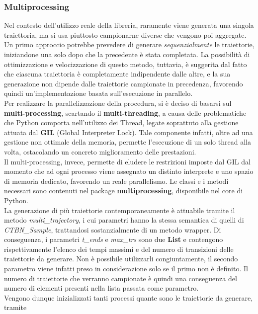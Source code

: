   \subsubsection{Multiprocessing}
  Nel contesto dell'utilizzo reale della libreria, raramente viene generata una singola traiettoria, ma si usa piuttosto
  campionarne diverse che vengono poi aggregate. Un primo approccio potrebbe prevedere di generare
  \textit{sequenzialmente} le traiettorie, iniziandone una solo dopo che la precedente è stata completata.
  La possibilità di ottimizzazione e velocizzazione di questo metodo, tuttavia, è suggerita dal fatto
  che ciascuna traiettoria è completamente indipendente dalle altre, e la sua generazione non dipende
  dalle traiettorie campionate in precedenza, favorendo quindi un'implementazione basata sull'esecuzione in parallelo.\\
  Per realizzare la parallelizzazione della procedura, si è deciso di basarsi sul \textbf{multi-processing},
  scartando il \textbf{multi-threading}, a causa delle problematiche che Python comporta
  nell'utilizzo dei Thread, legate soprattuto alla gestione attuata dal \textbf{GIL} (Global Interpreter Lock).
  Tale componente infatti, oltre ad una gestione non ottimale della memoria, permette l'esecuzione di un solo thread alla volta, 
  ostacolando un concreto miglioramento delle prestazioni.\\
  Il multi-processing, invece, permette di eludere le restrizioni imposte dal GIL dal momento che
  ad ogni processo viene assegnato un distinto interprete e uno spazio di memoria dedicato, favorendo
  un reale parallelismo. Le classi e i metodi necessari sono contenuti nel package \textbf{multiprocessing},
  disponibile nel core di Python.\\
  La generazione di più traiettorie contemporaneamente è attuabile tramite il metodo
  \textit{multi\_trajectory}, i cui parametri hanno la stessa semantica di quelli di \textit{CTBN\_Sample},
  trattandosi sostanzialmente di un metodo wrapper. 
  Di conseguenza, i parametri \textit{t\_ends} e \textit{max\_trs} sono due \textbf{List} e contengono rispettivamente
  l'elenco dei tempi massimi e del numero di transizioni delle traiettorie da generare.
  Non è possibile utilizzarli congiuntamente, il secondo parametro viene infatti preso in considerazione
  solo se il primo non è definito. Il numero di traiettorie che verranno campionate è quindi una conseguenza del numero 
  di elementi presenti nella lista passata come parametro.\\
  Vengono dunque inizializzati tanti processi quante sono le traiettorie da generare, tramite
